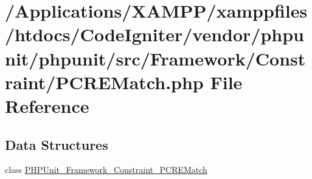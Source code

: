 \hypertarget{_p_c_r_e_match_8php}{}\section{/\+Applications/\+X\+A\+M\+P\+P/xamppfiles/htdocs/\+Code\+Igniter/vendor/phpunit/phpunit/src/\+Framework/\+Constraint/\+P\+C\+R\+E\+Match.php File Reference}
\label{_p_c_r_e_match_8php}
\subsection*{Data Structures}
\begin{DoxyCompactItemize}
\item 
class \mbox{\hyperlink{class_p_h_p_unit___framework___constraint___p_c_r_e_match}{P\+H\+P\+Unit\+\_\+\+Framework\+\_\+\+Constraint\+\_\+\+P\+C\+R\+E\+Match}}
\end{DoxyCompactItemize}
